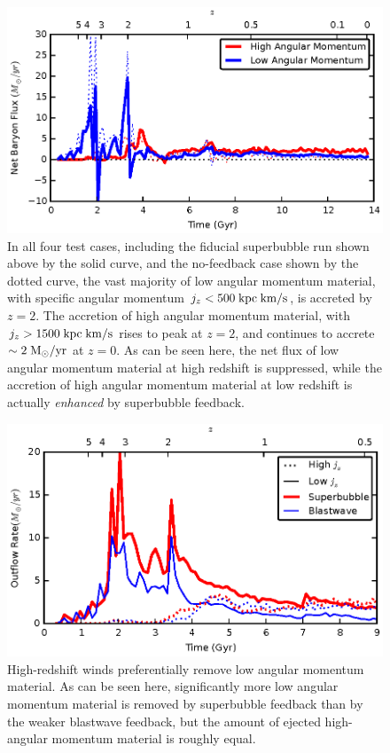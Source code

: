 \begin{figure}
    \includegraphics[width=\columnwidth]{figures2/angular_momentum_netflux.eps}
    \caption[Net accretion as a function of angular momentum]{In all four test
    cases, including the fiducial superbubble run shown above by the solid
    curve, and the no-feedback case shown by the dotted curve, the vast majority
    of low angular momentum material, with specific angular momentum $ j_z <
    500\; \rm {kpc\; km/s}$, is accreted by $z=2$.  The accretion of high
    angular momentum material, with $j_z > 1500\; \rm{kpc\; km/s}$ rises to peak
    at $z=2$, and continues to accrete $\sim 2\; \rm{M_\odot/yr}$ at $z=0$.  As
    can be seen here, the net flux of low angular momentum material at high
    redshift is suppressed, while the accretion of high angular momentum
    material at low redshift is actually {\it enhanced} by superbubble
    feedback.}
        \label{angular_momentum_netflux}
\end{figure}
\begin{figure}
    \includegraphics[width=\columnwidth]{figures2/angular_momentum_outflow.eps}
    \caption[High redshift winds remove low angular momentum gas]{High-redshift
    winds preferentially remove low angular momentum material.  As can be seen
    here, significantly more low angular momentum material is removed by
    superbubble feedback than by the weaker blastwave feedback, but the amount
    of ejected high-angular momentum material is roughly equal.}
        \label{angular_momentum_outflow}
\end{figure}
